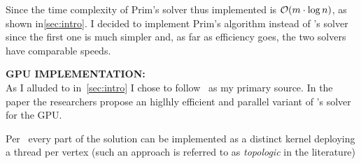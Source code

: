 \documentclass[a4paper,10pt]{article}
\begin{document}
Since the time complexity of Prim's solver thus implemented is $\mathcal{O}(m \cdot \log{n})$, as shown in\ref{sec:intro}. I decided to implement Prim's algorithm instead of \brka's solver since the first one is much simpler and, as far as efficiency goes, the two solvers have comparable speeds.

\bigskip
{}
\makeatletter{}\makeatother\label{sec:gpu-implementation}
\noindent
\textbf{GPU IMPLEMENTATION:}
\\
As I alluded to in~\ref{sec:intro} I chose to follow~\cite{generic-he-boruvka} as my primary source. In the paper the researchers propose an higlhly efficient and parallel variant of \brka's solver for the GPU.

Per~\cite{generic-he-boruvka} every part of the solution can be implemented as a distinct kernel
deploying a thread per vertex (such an approach is referred to as \textit{topologic} in the
literature)
\end{document}
